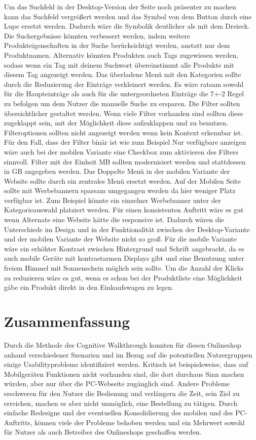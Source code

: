 \documentclass[	12pt, 
				a4paper, 
				BCOR=10mm, %
				DIV=12, 
				parskip=half, %
				headings=small, %
				twoside, %
				ngerman,
				bibliography=totoc,index=totoc, listof=totoc,
				numbers=noendperiod
				]{scrbook} %
\theoremstyle{plain}%
\theoremstyle{definition}
\theoremstyle{remark}
\begin{document}
Um das Suchfeld in der Desktop-Version der Seite noch präsenter zu machen kann das Suchfeld vergrößert werden und das Symbol von dem Button durch eine Lupe ersetzt werden. Dadurch wäre die Symbolik deutlicher als mit dem Dreieck.
Die Suchergebnisse könnten verbessert werden, indem weitere Produkteigenschaften in der Suche berücksichtigt werden, anstatt nur dem Produktnamen. Alternativ könnten Produkten auch Tags zugewiesen werden, sodass wenn ein Tag mit deinem Suchwort übereinstimmt alle Produkte mit diesem Tag angezeigt werden.
Das überladene Menü mit den Kategorien sollte durch die Reduzierung der Einträge verkleinert werden. Es wäre ratsam sowohl für die Haupteinträge als auch für die untergeordneten Einträge die 7+-2 Regel zu befolgen um dem Nutzer die manuelle Suche zu ersparen. 
Die Filter sollten übersichtlicher gestaltet werden. Wenn viele Filter vorhanden sind sollten diese zugeklappt sein, mit der Möglichkeit diese aufzuklappen und zu benutzen. Filteroptionen sollten nicht angezeigt werden wenn kein Kontext erkennbar ist. Für den Fall, dass der Filter binär ist wie zum Beispiel \glqq Nur verfügbare anzeigen\grqq{} wäre auch bei der mobilen Variante eine Checkbox zum aktivieren des Filters sinnvoll.
Filter mit der Einheit MB sollten modernisiert werden und stattdessen in GB angegeben werden.
Das Doppelte Menü in der mobilen Variante der Website sollte durch ein zentrales Menü ersetzt werden. Auf der Mobilen Seite sollte mit Werbebannern sparsam umgegangen werden da hier weniger Platz verfügbar ist. Zum Beispiel könnte ein einzelner Werbebanner unter der Kategorieauswahl platziert werden.
Für einen konsistenten Auftritt wäre es gut wenn Alternate eine Website hätte die responsive ist. Dadurch wären die Unterschiede im Design und in der Funktionalität zwischen der Desktop-Variante und der mobilen Variante der Website nicht so groß. Für die mobile Variante wäre ein erhöhter Kontrast zwischen Hintergrund und Schrift angebracht, da es auch mobile Geräte mit kontrastarmen Displays gibt und eine Benutzung unter freiem Himmel mit Sonnenschein möglich sein sollte.
Um die Anzahl der Klicks zu reduzieren wäre es gut, wenn es schon bei der Produktliste eine Möglichkeit gäbe ein Produkt direkt in den Einkaufswagen zu legen.

\chapter{Zusammenfassung}
Durch die Methode des Cognitive Walkthrough konnten für diesen Onlineshop anhand verschiedener Szenarien und im Bezug auf die potentiellen Nutzergruppen einige Usabilityprobleme identifiziert werden. Kritisch ist beispielsweise, dass auf Mobilgeräten Funktionen nicht vorhanden sind, die dort durchaus Sinn machen würden, aber nur über die PC-Webseite zugänglich sind. Andere Probleme erschweren für den Nutzer die Bedienung und verlängern die Zeit, sein Ziel zu erreichen, machen es aber nicht unmöglich, eine Bestellung zu tätigen. Durch einfache Redesigns und der eventuellen Konsolidierung des mobilen und des PC-Auftritts, können viele der Probleme behoben werden und ein Mehrwert sowohl für Nutzer als auch Betreiber des Onlineshops geschaffen werden.
\end{document}
